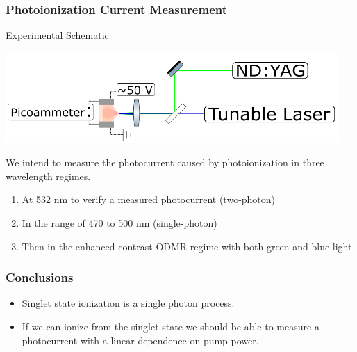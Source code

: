 \documentclass{beamer}
\begin{document}
\begin{frame}\frametitle{Photoionization Current Measurement}
    \begin{block}{Experimental Schematic}
        \begin{center}
            \includegraphics[width=0.95\textwidth]{Images/WP1Schematic.png}
        \end{center}
        We intend to measure the photocurrent caused by photoionization in three wavelength regimes.
        \begin{enumerate}
            \item At 532 nm to verify a measured photocurrent (two-photon)
            \item In the range of 470 to 500 nm (single-photon)
            \item Then in the enhanced contrast ODMR regime with both green and blue light
        \end{enumerate}
    \end{block}
\end{frame}

\begin{frame}\frametitle{Conclusions}
    \begin{itemize}
        \item Singlet state ionization is a single photon process.
        \item If we can ionize from the singlet state we should be able to measure a photocurrent with a linear dependence on pump power.
    \end{itemize}
\end{frame}
\end{document}
